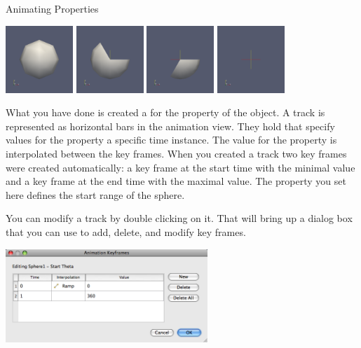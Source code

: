 \begin{exercise}{Animating Properties}
  \begin{inlinefig}
    \includegraphics[width=1in]{images/AnimateSphere0}
    \includegraphics[width=1in]{images/AnimateSphere1}
    \includegraphics[width=1in]{images/AnimateSphere2}
    \includegraphics[width=1in]{images/AnimateSphere3}
  \end{inlinefig}
\end{exercise}

What you have done is created a  for the 
property of the  object.  A track is represented as horizontal
bars in the animation view.  They hold  that specify
values for the property a specific time instance.  The value for the
property is interpolated between the key frames.  When you created a track
two key frames were created automatically: a key frame at the start time
with the minimal value and a key frame at the end time with the maximal
value.  The property you set here defines the start range of the sphere.

You can modify a track by double clicking on it.  That will bring up a
dialog box that you can use to add, delete, and modify key frames.

\begin{inlinefig}
  \includegraphics[width=3in]{images/AnimationKeyframesDialog}
\end{inlinefig}

